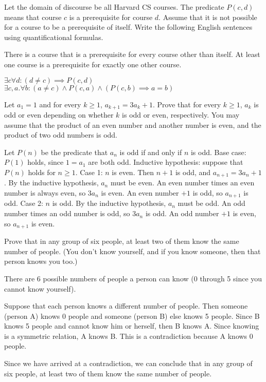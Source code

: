 \documentclass[solution, letterpaper]{cs20exam}
\begin{document}
\pagebreak

\problem{}{} Let the domain of discourse be all Harvard CS courses. The predicate $P(c, d)$ means that course $c$ is a prerequisite for course $d$. Assume that it is not possible for a course to be a prerequisite of itself. Write the following English sentences using quantificational formulas.

\subproblem There is a course that is a prerequisite for every course other than itself.
\subproblem At least one course is a prerequisite for exactly one other course.

\begin{solution}
\subsolution $\exists c \forall d: (d \neq c) \implies P(c,d)$
\subsolution $\exists c, a . \forall b : (a \neq c) \land P(c, a) \land (P(c, b) \implies a = b)$

\end{solution}

\pagebreak

\problem{}{}
Let $a_1=1$ and for every $k \geq 1$, $a_{k+1}=3a_k+1$. Prove that for every $k \geq1 $, $a_k$ is odd or even depending on whether $k$ is odd or even, respectively. You may assume that the product of an even number and another number is even, and the product of two odd numbers is odd.

\begin{solution}
Let $P(n)$ be the predicate that $a_n$ is odd if and only if $n$ is odd. Base case: $P(1)$ holds, since $1 = a_1$ are both odd. Inductive hypothesis: suppose that $P(n)$ holds for $n \ge 1$. Case 1: $n$ is even. Then $n+1$ is odd, and $a_{n+1} = 3a_n + 1$. By the inductive hypothesis, $a_n$ must be even. An even number times an even number is always even, so $3a_n$ is even. An even number $+1$ is odd, so $a_{n+1}$ is odd. Case 2: $n$ is odd. By the inductive hypothesis, $a_n$ must be odd. An odd number times an odd number is odd, so $3a_n$ is odd. An odd number $+1$ is even, so $a_{n+1}$ is even.
\end{solution}

\pagebreak

\problem{}{}
Prove that in any group of six people, at least two of them know the same number of people. (You don't know yourself, and if you know someone, then that person knows you too.)

\begin{solution}

There are 6 possible numbers of people a person can know (0 through 5 since you cannot know yourself).

Suppose that each person knows a different number of people. Then someone (person A) knows 0 people and someone (person B) else knows 5 people. Since B knows 5 people and cannot know him or herself, then B knows A. Since knowing is a symmetric relation, A knows B. This is a contradiction because A knows 0 people.

Since we have arrived at a contradiction, we can conclude that in any group of six people, at least two of them know the same number of people.

\end{solution}
\end{document}
